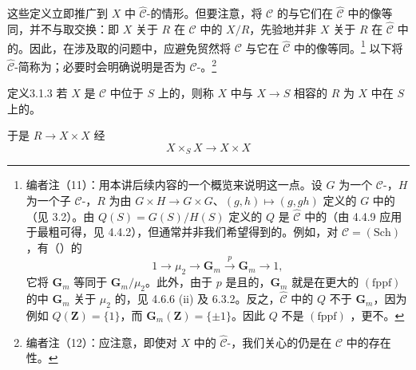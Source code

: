 这些定义立即推广到 $X$ 中 $\widehat{\mathcal C}$-的情形。但要注意，将 $\mathcal C$ 的与它们在 $\widehat{\mathcal C}$ 中的像等同，并不与取交换：即 $X$ 关于 $R$ 在 $\mathcal C$ 中的 $X/R$，先验地并非 $X$ 关于 $R$ 在 $\widehat{\mathcal C}$ 中的。因此，在涉及取的问题中，应避免贸然将 $\mathcal C$ 与它在 $\widehat{\mathcal C}$ 中的像等同。\footnote{编者注（11）：用本讲后续内容的一个概览来说明这一点。设 $G$ 为一个 $\mathcal C$-，$H$ 为一个子 $\mathcal C$-，$R$ 为由 $G\times H\to G\times G$、$(g,h)\mapsto(g,gh)$ 定义的 $G$ 中的（见 3.2）。由 $Q(S)=G(S)/H(S)$ 定义的 $Q$ 是 $\widehat{\mathcal C}$ 中的（由 4.4.9 应用于最粗可得，见 4.4.2），但通常并非我们希望得到的。例如，对 $\mathcal C=(\mathrm{Sch})$，有（）的
\[
 1\longrightarrow\mu_2\longrightarrow\mathbf G_m\xrightarrow{p}\mathbf G_m\longrightarrow1,
\]
它将 $\mathbf G_m$ 等同于 $\mathbf G_m/\mu_2$。此外，由于 $p$ 是且的，$\mathbf G_m$ 就是在更大的 $(\mathrm{fppf})$ 的中 $\mathbf G_m$ 关于 $\mu_2$ 的，见 4.6.6 (ii) 及 6.3.2。反之，$\widehat{\mathcal C}$ 中的 $Q$ 不于 $\mathbf G_m$，因为例如 $Q(\mathbf Z)=\{1\}$，而 $\mathbf G_m(\mathbf Z)=\{\pm1\}$。因此 $Q$ 不是 $(\mathrm{fppf})$ ，更不。}
以下将 $\widehat{\mathcal C}$-简称为；必要时会明确说明是否为 $\mathcal C$-。\footnote{编者注（12）：应注意，即使对 $X$ 中的 $\widehat{\mathcal C}$-，我们关心的仍是在 $\mathcal C$ 中的存在性。}
\begin{SGAresult}{定义}{3.1.3}
若 $X$ 是 $\mathcal C$ 中位于 $S$ 上的，则称 $X$ 中与 $X\to S$ 相容的 $R$ 为 $X$ 中在 $S$ 上的。
\end{SGAresult}
于是 $R\to X\times X$ 经
\[
 X\times_S X\longrightarrow X\times X
\]
